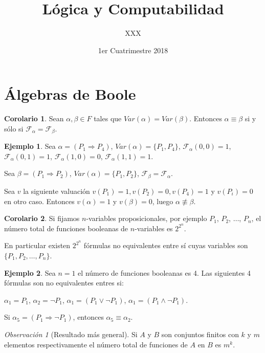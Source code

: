 \documentclass[a4paper,11pt]{article}
\title{Lógica y Computabilidad}
\author{XXX}
\date{1er Cuatrimestre 2018}
\theoremstyle{definition}
\newtheorem{exap}{Ejemplo}[section]
\newtheorem{coro}{Corolario}[section]
\theoremstyle{remark}
\newtheorem*{remk}{Observación}
\def\FF{\mathcal{F}}
\def\FFa{\mathcal{F}_{\alpha}}
\begin{document}
\maketitle

\section{Álgebras de Boole}

\begin{coro}
Sean $\alpha, \beta \in F$ tales que $Var(\alpha) = Var(\beta)$. Entonces  $\alpha \equiv \beta$
si y sólo si $\FFa = \FF_{\beta}$.
\end{coro}

\begin{exap}
Sea $\alpha = (P_1 \Rightarrow P_4)$, $Var(\alpha) = \{P_1, P_4\}$, $\FFa(0, 0) = 1$, $\FFa(0, 1) = 1$,
$\FFa(1, 0) = 0$, $\FFa(1, 1) = 1$.

Sea $\beta = (P_1 \Rightarrow P_2)$, $Var(\alpha) = \{P_1, P_2\}$, $\FF_{\beta} = \FFa$.

Sea $v$ la siguiente valuación $v(P_1) = 1, v(P_2) = 0, v(P_4) = 1$ y $v(P_i) = 0$ en otro caso.
Entonces $v(\alpha) = 1$ y $v(\beta) = 0$, luego $\alpha \not\equiv \beta$.
\end{exap}

\begin{coro}
Si fijamos $n$-variables proposicionales, por ejemplo $P_1$, $P_2$, $\dots$, $P_n$, el número total de
funciones booleanas de $n$-variables es $2^{2^n}$.

En particular existen $2^{2^n}$ fórmulas no equivalentes entre sí cuyas variables son $\{P_1, P_2,
\dots, P_n\}$.
\end{coro}

\begin{exap}
Sea $n = 1$ el número de funciones booleanas es 4. Las siguientes 4 fórmulas son no equivalentes
entres si:

$\alpha_1 = P_1$, $\alpha_2 = \neg P_1$, $\alpha_1 = (P_1 \vee \neg P_1)$, 
$\alpha_1 = (P_1 \wedge \neg P_1)$.

Si $\alpha_5 = (P_1 \Rightarrow \neg P_1)$, entonces $\alpha_5 \equiv \alpha_2$.
\end{exap}

\begin{remk}[Resultado más general]
Si $A$ y $B$ son conjuntos finitos con $k$ y $m$ elementos respectivamente el número total
de funciones de $A$ en $B$ es $m^k$.
\end{remk}
\end{document}
